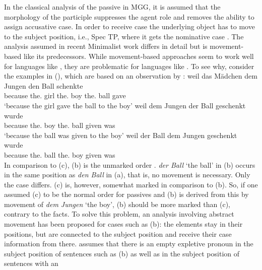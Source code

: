 \documentclass[output=paper
 	        ,biblatex
                ,babelshorthands
                ,newtxmath
                ,draftmode
                ,colorlinks, citecolor=brown
]{langscibook}
\begin{document}

In the classical analysis of the passive in MGG, it is assumed that the morphology of the participle suppresses
the agent role and removes the ability to assign accusative case. In order to receive case the
underlying object has to move to the subject position, i.e., Spec TP, where it gets the nominative case \citep[]{Chomsky81a}.
\eal
{}
\zl
The analysis assumed in recent Minimalist work differs in detail but is movement-based like its
predecessors. While movement-based approaches seem to work well for  languages like , they
are problematic for  languages like . To see why, consider the examples in
(), which are based on an observation by \citet[Section~4.4.3]{Lenerz77}:
\eal
\label{ex-passive-German-no-movement}
\ex 
\gll weil das Mädchen dem Jungen den Ball schenkte\\
     because the.\nom{} girl the.\dat{} boy the.\acc{} ball gave\\
\glt `because the girl gave the ball to the boy'
\ex 
\gll weil dem Jungen der Ball geschenkt wurde\\
	 because the.\dat{} boy the.\nom{} ball given was\\
\glt `because the ball was given to the boy'
\ex 
\gll weil der Ball dem Jungen geschenkt wurde\\
     because the.\nom{} ball the.\dat{} boy given was\\
\zl
In comparison to (c), (b) is the unmarked order \citep{Hoehle82a}. \emph{der Ball} `the ball' in (b) occurs
in the same position as \emph{den Ball} in (a), that is, no movement is necessary. Only the case differs.
(c) is, however, somewhat marked in comparison to (b). So, if one assumed (c) to
be the normal order for passives and (b) is derived from this by movement of \emph{dem
  Jungen} `the boy', (b) should be more marked than (c), contrary to the facts. To
solve this problem, an analysis involving abstract movement has been proposed for
cases such as (b): the elements stay in their positions, but are connected to
the subject position and receive their case information from there. \citet[]{Grewendorf93}
assumes that there is an empty expletive pronoun
in the subject position of sentences such as (b) as well as in the subject position of sentences with an
\end{document}
